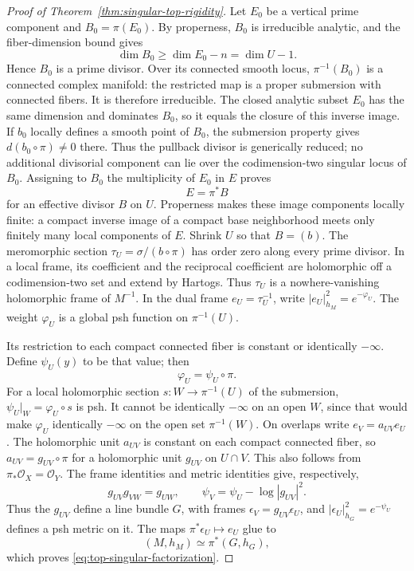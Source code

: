 \documentclass[11pt,reqno]{amsart}
\numberwithin{equation}{section}
\theoremstyle{definition}
\theoremstyle{remark}
\begin{document}
\begin{proof}[Proof of Theorem~\ref{thm:singular-top-rigidity}]
Let $E_0$ be a vertical prime component and $B_0=\pi(E_0)$. By
properness, $B_0$ is irreducible analytic, and the fiber-dimension bound gives
\[
 \dim B_0\geq\dim E_0-n=\dim U-1.
\]
Hence $B_0$ is a prime divisor. Over its connected smooth locus,
$\pi^{-1}(B_0)$ is a connected complex manifold: the restricted map
is a proper submersion with connected fibers. It is therefore
irreducible. The closed analytic subset $E_0$ has the same dimension
and dominates $B_0$, so it equals the closure of this inverse image.
If $b_0$ locally defines a smooth point of $B_0$, the submersion property
gives $d(b_0\circ\pi)\ne0$ there. Thus the pullback divisor is generically
reduced; no additional divisorial component can lie over the
codimension-two singular locus of $B_0$. Assigning to $B_0$ the
multiplicity of $E_0$ in $E$ proves
\begin{equation}\label{eq:vertical-divisor-pullback}
 E=\pi^*B
\end{equation}
for an effective divisor $B$ on $U$. Properness makes these image
components locally finite: a compact inverse image of a compact
base neighborhood meets only finitely many local components of $E$.
Shrink $U$ so that $B=(b)$.
The meromorphic section $\tau_U=\sigma/(b\circ\pi)$ has order zero
along every prime divisor.  In a local frame, its coefficient and
the reciprocal coefficient are holomorphic off a codimension-two
set and extend by Hartogs.  Thus $\tau_U$ is a nowhere-vanishing
holomorphic frame of $M^{-1}$. In the dual
frame $e_U=\tau_U^{-1}$, write $|e_U|_{h_M}^2=e^{-\varphi_U}$.
The weight $\varphi_U$ is a global psh function on $\pi^{-1}(U)$.

Its restriction to each compact connected fiber is constant or
identically $-\infty$. Define $\psi_U(y)$ to be that value; then
\begin{equation}\label{eq:residual-weight-descends}
 \varphi_U=\psi_U\circ\pi.
\end{equation}
For a local holomorphic section $s:W\to\pi^{-1}(U)$ of the submersion,
$\psi_U|_W=\varphi_U\circ s$ is psh. It cannot be identically
$-\infty$ on an open $W$, since that would make $\varphi_U$ identically
$-\infty$ on the open set $\pi^{-1}(W)$.
On overlaps write $e_V=a_{UV}e_U$. The holomorphic unit $a_{UV}$ is
constant on each compact connected fiber, so
$a_{UV}=g_{UV}\circ\pi$ for a holomorphic unit $g_{UV}$ on $U\cap V$.
This also follows from $\pi_*\mathcal O_X=\mathcal O_Y$.
The frame identities and metric identities give, respectively,
\[
 g_{UV}g_{VW}=g_{UW},\qquad
 \psi_V=\psi_U-\log|g_{UV}|^2.
\]
Thus the $g_{UV}$ define a line bundle $G$, with frames
$\epsilon_V=g_{UV}\epsilon_U$, and
$|\epsilon_U|_{h_G}^2=e^{-\psi_U}$ defines a psh metric on it.
The maps $\pi^*\epsilon_U\mapsto e_U$ glue to
\[
 (M,h_M)\simeq\pi^*(G,h_G),
\]
which proves \eqref{eq:top-singular-factorization}.


\end{proof}
\end{document}
